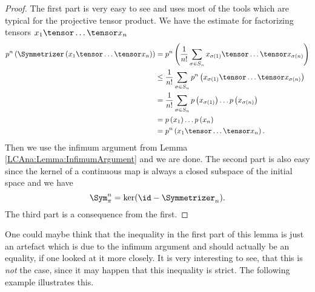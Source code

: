 \begin{proof}
	The first part is very easy to see and uses most of the tools which are 
	typical for the projective tensor product. We have the estimate for 
	factorizing tensors $x_1 \tensor \ldots \tensor x_n$
	\begin{align*}
		p^n \left(
			\Symmetrizer \left(
				x_1 \tensor \ldots \tensor x_n
			\right)
		\right)
		& =
		p^n \left(
			\frac{1}{n!}
			\sum	\limits_{\sigma \in S_n}
			x_{\sigma(1)} 
			\tensor \ldots \tensor 
			x_{\sigma(n)}
		\right)
		\\
		& \leq
		\frac{1}{n!}
		\sum\limits_{\sigma \in S_n}
		p^n \left(
			x_{\sigma(1)} 
			\tensor \ldots \tensor 
			x_{\sigma(n)}
		\right)
		\\
		& =
		\frac{1}{n!}
		\sum\limits_{\sigma \in S_n}
		p \left( x_{\sigma(1)} \right)
		\ldots
		p \left( x_{\sigma(n)} \right)
		\\
		& =
		p \left( x_1 \right)
		\ldots
		p \left( x_n \right)
		\\
		& =
		p^n \left(
			x_1 \tensor \ldots \tensor x_n
		\right).
	\end{align*}
	Then we use the infimum argument from Lemma 
	\ref{LCAna:Lemma:InfimumArgument} and we are done.
	The second part is also easy since the kernel of a continuous map is
	always a closed subspace of the initial space and we have
	\begin{equation*}
		\Sym_{\pi}^n 
		= 
		\ker (\id - \Symmetrizer_n).
	\end{equation*}
	The third part is a consequence from the first.
\end{proof}
One could maybe think that the inequality in the first part of this lemma is 
just an artefact which is due to the infimum argument and should actually be 
an equality, if one looked at it more closely. It is very interesting to see, 
that this is \textit{not} the case, since it may happen that this 
inequality is strict. The following example illustrates this.
